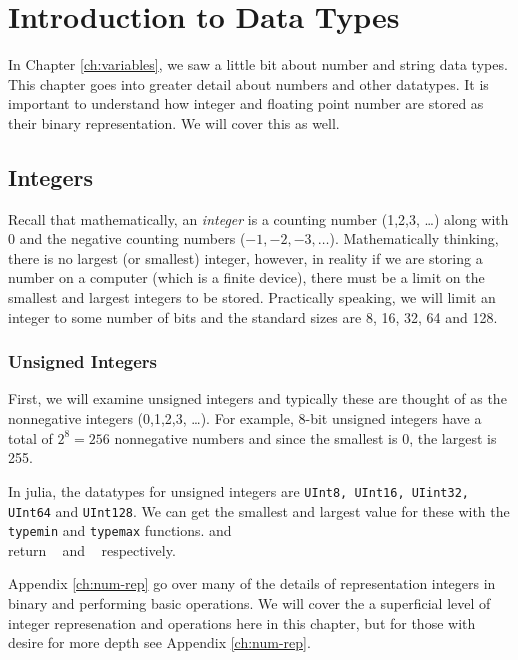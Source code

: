 
\hypertarget{ch:data-types}{%
\chapter{Introduction to Data Types}\label{ch:data-types}}

In Chapter \ref{ch:variables}, we saw a little bit about number and string data types.  This chapter goes into greater detail about numbers and other datatypes.  It is important to understand how integer and floating point number are stored as their binary representation. We will cover this as well.  

\section{Integers}

Recall that mathematically, an \emph{integer} is a counting number (1,2,3, \ldots) along with 0 and the negative counting numbers ($-1,-2,-3,\ldots$).  Mathematically thinking, there is no largest (or smallest) integer, however, in reality if we are storing a number on a computer (which is a finite device), there must be a limit on the smallest and largest integers to be stored.  Practically speaking, we will limit an integer to some number of bits and the standard sizes are 8, 16, 32, 64 and 128.  

\subsection{Unsigned Integers}

First, we will examine unsigned integers and typically these are thought of as the nonnegative integers (0,1,2,3, \ldots).  For example, 8-bit unsigned integers have a total of $2^8=256$ nonnegative numbers and since the smallest is 0, the largest is 255.  

In julia, the datatypes for unsigned integers are \texttt{UInt8, UInt16, UIint32, UInt64} and \texttt{UInt128}.  We can get the smallest and largest value for these with the \texttt{typemin} and \texttt{typemax} functions.  and\\  return  \printpythontex[verb]~ and  \printpythontex[verb]~ respectively.  

Appendix \ref{ch:num-rep} go over many of the details of representation integers in binary and performing basic operations.  We will cover the a superficial level of integer represenation and operations here in this chapter, but for those with desire for more depth see Appendix \ref{ch:num-rep}. 

